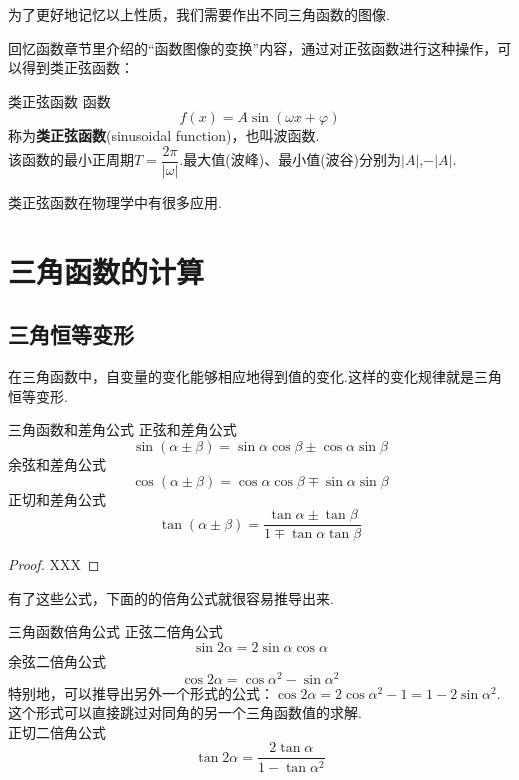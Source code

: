 \documentclass[lang=cn, zihao=5]{elegantbook}
\begin{document}
为了更好地记忆以上性质，我们需要作出不同三角函数的图像.


回忆函数章节里介绍的“函数图像的变换”内容，通过对正弦函数进行这种操作，可以得到类正弦函数：

\begin{definition}{类正弦函数}
    函数$$f(x)=A \sin (\omega x + \varphi)$$
    称为\textbf{类正弦函数}(sinusoidal function)，也叫波函数.\\
    该函数的最小正周期$T=\dfrac{2\pi}{|\omega|}$.最大值(波峰)、最小值(波谷)分别为$|A|$,$-|A|$.
\end{definition}

类正弦函数在物理学中有很多应用.

\section{三角函数的计算}

\subsection{三角恒等变形}

在三角函数中，自变量的变化能够相应地得到值的变化.这样的变化规律就是三角恒等变形.

\begin{theorem}{三角函数和差角公式} %
    正弦和差角公式$$\sin{(\alpha \pm \beta)}=\sin{\alpha}\cos{\beta} \pm \cos{\alpha}\sin{\beta}$$
    余弦和差角公式$$\cos{(\alpha \pm \beta)}=\cos{\alpha}\cos{\beta} \mp \sin{\alpha}\sin{\beta}$$
    正切和差角公式$$\tan{(\alpha \pm \beta)}=\frac{\tan{\alpha} \pm \tan{\beta}}{1 \mp \tan{\alpha}\tan{\beta}}$$
\end{theorem}
\begin{proof}
    XXX
\end{proof}

有了这些公式，下面的的倍角公式就很容易推导出来.

\begin{proposition}{三角函数倍角公式} %
    正弦二倍角公式$$\sin{2\alpha}=2\sin{\alpha}\cos{\alpha}$$
    余弦二倍角公式$$\cos{2\alpha}=\cos{\alpha ^2}-\sin{\alpha ^2}$$
    特别地，可以推导出另外一个形式的公式：$\cos{2\alpha}=2\cos{\alpha ^2}-1=1-2\sin{\alpha ^2}$.这个形式可以直接跳过对同角的另一个三角函数值的求解.\\
    正切二倍角公式$$\tan{2\alpha}=\frac{2\tan{\alpha}}{1-\tan{\alpha ^2}}$$
\end{proposition}
\end{document}
